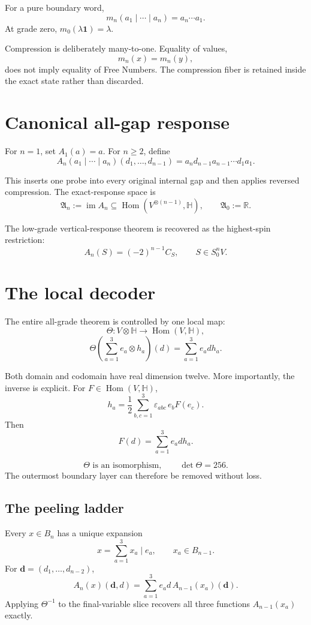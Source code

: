 \documentclass[11pt,a4paper]{article}
\newcommand{\Hq}{\mathbb H}
\newcommand{\RR}{\mathbb R}
\newcommand{\tensor}{\mathbin{|}}
\newcommand{\Img}{\operatorname{im}}
\newcommand{\Hom}{\operatorname{Hom}}
\begin{document}
For a pure boundary word,
\[
\boxed{
 m_n(a_1\tensor\cdots\tensor a_n)=a_n\cdots a_1.
}
\]
At grade zero, $m_0(\lambda\mathbf1)=\lambda$.

Compression is deliberately many-to-one. Equality of values,
\[
m_n(x)=m_n(y),
\]
does not imply equality of Free Numbers. The compression fiber is retained inside the exact state rather than discarded.

\section{Canonical all-gap response}

For $n=1$, set $A_1(a)=a$. For $n\ge2$, define
\[
\boxed{
A_n(a_1\tensor\cdots\tensor a_n)(d_1,\ldots,d_{n-1})
=
a_nd_{n-1}a_{n-1}\cdots d_1a_1.
}
\]

This inserts one probe into every original internal gap and then applies reversed compression. The exact-response space is
\[
\mathfrak A_n:=\Img A_n
\subseteq
\Hom(V^{\otimes(n-1)},\Hq),
\qquad
\mathfrak A_0:=\RR.
\]

The low-grade vertical-response theorem is recovered as the highest-spin restriction:
\[
A_n(S)=(-2)^{n-1}C_S,
\qquad
S\in S^n_0V.
\]

\section{The local decoder}

The entire all-grade theorem is controlled by one local map:
\[
\Theta:V\otimes\Hq\longrightarrow\Hom(V,\Hq),
\]
\[
\boxed{
\Theta\!\left(\sum_{a=1}^3e_a\otimes h_a\right)(d)
=
\sum_{a=1}^3e_a d h_a.
}
\]

Both domain and codomain have real dimension twelve. More importantly, the inverse is explicit. For $F\in\Hom(V,\Hq)$,
\[
\boxed{
h_a
=
\frac12
\sum_{b,c=1}^3
\varepsilon_{abc}\,e_bF(e_c).
}
\]
Then
\[
F(d)=\sum_{a=1}^3e_a d h_a.
\]

\begin{resultbox}
\[
\boxed{
\Theta\text{ is an isomorphism},
\qquad
\det\Theta=256.
}
\]
The outermost boundary layer can therefore be removed without loss.
\end{resultbox}

\subsection{The peeling ladder}

Every $x\in B_n$ has a unique expansion
\[
x=\sum_{a=1}^3x_a\tensor e_a,
\qquad
x_a\in B_{n-1}.
\]
For $\mathbf d=(d_1,\ldots,d_{n-2})$,
\[
A_n(x)(\mathbf d,d)
=
\sum_{a=1}^3e_a d\,A_{n-1}(x_a)(\mathbf d).
\]
Applying $\Theta^{-1}$ to the final-variable slice recovers all three functions $A_{n-1}(x_a)$ exactly.
\end{document}
